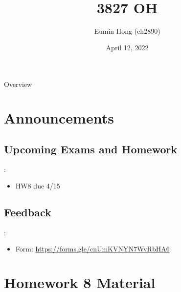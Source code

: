 \documentclass{../slides}
\title{3827 OH}
\author{Eumin Hong (eh2890)}
\institute{Columbia University}
\date{April 12, 2022}
\begin{document}
\begin{frame}
    \titlepage
\end{frame}

\begin{frame}{Overview}
\begin{multicols}{2}
\tableofcontents
\end{multicols}
\end{frame}

\section{Announcements}
\subsection{Upcoming Exams and Homework}
\begin{frame}{\secname: \subsecname}
    \begin{itemize}
        \item HW8 due 4/15
    \end{itemize}
\end{frame}

\subsection{Feedback}
\begin{frame}{\secname: \subsecname}
    \begin{itemize}
        \item Form: \url{https://forms.gle/cnUmKVNYN7WvRbHA6}
    \end{itemize}
\end{frame}

\section{Homework 8 Material}
\end{document}
